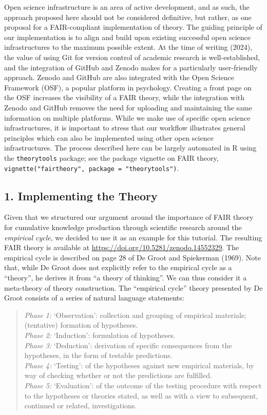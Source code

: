 \documentclass[
  man,floatsintext]{apa6}
\begin{document}
Open science infrastructure is an area of active development, and as such,
the approach proposed here should not be considered definitive,
but rather, as one proposal for a FAIR-compliant implementation of theory.
The guiding principle of our implementation is to align and build upon existing successful open science infrastructures to the maximum possible extent.
At the time of writing (2024),
the value of using Git for version control of academic research is well-established,
and the integration of GitHub and Zenodo makes for a particularly user-friendly approach.
Zenodo and GitHub are also integrated with the Open Science Framework (OSF),
a popular platform in psychology.
Creating a front page on the OSF increases the visibility of a FAIR theory,
while the integration with Zenodo and GitHub removes the need for uploading and maintaining the same information on multiple platforms.
While we make use of specific open science infrastructures, it is important to stress that our workflow illustrates general principles which can also be implemented using other open science infrastructures.
The process described here can be largely automated in R using the \texttt{theorytools} package; see the package vignette on FAIR theory, \texttt{vignette("fairtheory",\ package\ =\ "theorytools")}.

\subsection{1. Implementing the Theory}\label{implementing-the-theory}

Given that we structured our argument around the importance of FAIR theory for cumulative knowledge production through scientific research around the \emph{empirical cycle},
we decided to use it as an example for this tutorial.
The resulting FAIR theory is available at \url{https://doi.org/10.5281/zenodo.14552329}.
The empirical cycle is described on page 28 of De Groot and Spiekerman (1969).
Note that, while De Groot does not explicitly refer to the empirical cycle as a ``theory'', he derives it from ``a theory of thinking''.
We can thus consider it a meta-theory of theory construction.
The ``empirical cycle'' theory presented by De Groot consists of a series of natural language statements:

\begin{quote}
\emph{Phase 1:} `Observation': collection and grouping of empirical materials; (tentative) formation of hypotheses.\\
\emph{Phase 2:} `Induction': formulation of hypotheses.\\
\emph{Phase 3:} `Deduction': derivation of specific consequences from the hypotheses, in the form of testable predictions.\\
\emph{Phase 4:} `Testing': of the hypotheses against new empirical materials, by way of checking whether or not the predictions are fulfilled.\\
\emph{Phase 5:} `Evaluation': of the outcome of the testing procedure with respect to the hypotheses or theories stated, as well as with a view to subsequent, continued or related, investigations.
\end{quote}
\end{document}
